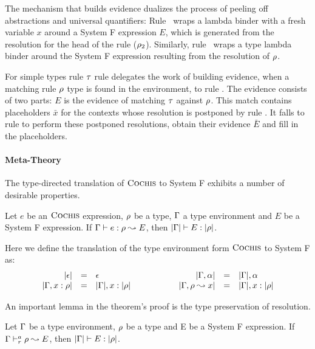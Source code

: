The mechanism that builds evidence dualizes the process of peeling off
abstractions and universal quantifiers: Rule ~wraps a lambda
binder with a fresh variable $x$ around a System F expression $E$, which is
generated from the resolution for the head of the rule ($\rho_2$). Similarly,
rule ~wraps a type lambda binder around the System F expression
resulting from the resolution of $\rho$.

For simple types rule $\tau$ rule  delegates the work of
building evidence, when a matching rule $\rho$ type is found in the
environment, to rule . The evidence consists of two parts:
$E$ is the evidence of matching $\tau$ against $\rho$. This match contains
placeholders $\bar{x}$ for the contexts whose resolution is postponed by rule
. It falls to rule  to perform these
postponed resolutions, obtain their evidence $\bar{E}$ and fill in the
placeholders.

\paragraph{Meta-Theory} The type-directed translation of $\textsc{Cochis}$ to System F exhibits a number
of desirable properties.

\begin{theorem}\label{thm:type:preservation} Let $e$ be an $\textsc{Cochis}$
  expression, $\rho$ be a type, $\Gamma$ a type environment and $E$ be a System F expression. If
  $\Gamma \vdash e:\rho \leadsto E$, then $|\Gamma| \vdash E:|\rho|$.
\end{theorem}
Here we define the translation of the type environment form $\textsc{Cochis}$ to System F as:
\begin{equation*}
\begin{array}{rcl@{\hspace{2cm}}rcl}
|\epsilon| & = & \epsilon & |\tenv,\alpha| & = & |\tenv|, \alpha \\
|\tenv,x : \rulet| & = & |\tenv|, x : |\rulet| &
|\tenv, \rulet \leadsto x| & = & |\tenv|, x : |\rulet|
\end{array}
\end{equation*}

An important lemma in the theorem's proof is the type preservation of 
resolution.
\begin{lemma}
Let $\Gamma$ be a type environment, $\rho$ be a type and E be a System F expression.
If $\Gamma \vdash^a_{r} \rho \leadsto E$, then $|\Gamma| \vdash E : |\rho|$.
\end{lemma}

